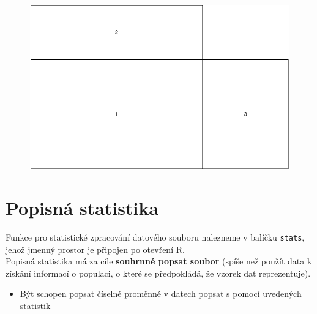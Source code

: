 \documentclass[
  letterpaper,
  DIV=11,
  numbers=noendperiod]{scrreprt}
\providecommand{\tightlist}{%
  \setlength{\itemsep}{0pt}\setlength{\parskip}{0pt}}\usepackage{longtable,booktabs,array}
\begin{document}
\begin{figure}[H]

{\centering \includegraphics{03_grafy_files/figure-pdf/unnamed-chunk-8-1.pdf}

}

\end{figure}


\hypertarget{popisnuxe1-statistika}{%
\chapter{Popisná statistika}\label{popisnuxe1-statistika}}

Funkce pro statistické zpracování datového souboru nalezneme v balíčku
\texttt{stats}, jehož jmenný prostor je připojen po otevření R.\\

Popisná statistika má za cíle \textbf{souhrnně popsat soubor} (spíše než
použít data k získání informací o populaci, o které se předpokládá, že
vzorek dat reprezentuje).

\begin{tcolorbox}[enhanced jigsaw, toprule=.15mm, breakable, title=\textcolor{quarto-callout-warning-color}{\faExclamationTriangle}\hspace{0.5em}{Cíle cvičení}, colframe=quarto-callout-warning-color-frame, bottomrule=.15mm, left=2mm, leftrule=.75mm, colbacktitle=quarto-callout-warning-color!10!white, colback=white, bottomtitle=1mm, toptitle=1mm, opacityback=0, opacitybacktitle=0.6, arc=.35mm, coltitle=black, rightrule=.15mm, titlerule=0mm]

\begin{itemize}
\tightlist
\item
  Být schopen popsat číselné proměnné v datech popsat s pomocí uvedených
  statistik\\
\end{itemize}

\end{tcolorbox}
\end{document}
